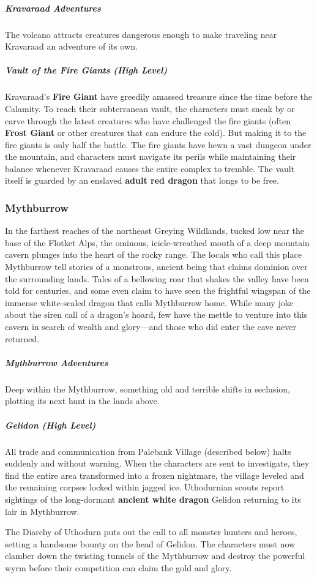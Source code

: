 \documentclass[10pt,a4paper,twoside,bg=print,twocolumn,openany,nodeprecatedcode]{dndbook}
\begin{document}
\subparagraph{Kravaraad Adventures}
The volcano attracts creatures dangerous enough to make traveling near Kravaraad an adventure of its own.

\subparagraph{Vault of the Fire Giants (High Level)}
Kravaraad's \textbf{Fire Giant} have greedily amassed treasure since the time before the Calamity. To reach their subterranean vault, the characters must sneak by or carve through the latest creatures who have challenged the fire giants (often \textbf{Frost Giant} or other creatures that can endure the cold). But making it to the fire giants is only half the battle. The fire giants have hewn a vast dungeon under the mountain, and characters must navigate its perils while maintaining their balance whenever Kravaraad causes the entire complex to tremble. The vault itself is guarded by an enslaved \textbf{adult red dragon} that longs to be free.

\subsubsection{Mythburrow}
In the farthest reaches of the northeast Greying Wildlands, tucked low near the base of the Flotket Alps, the ominous, icicle-wreathed mouth of a deep mountain cavern plunges into the heart of the rocky range. The locals who call this place Mythburrow tell stories of a monstrous, ancient being that claims dominion over the surrounding lands. Tales of a bellowing roar that shakes the valley have been told for centuries, and some even claim to have seen the frightful wingspan of the immense white-scaled dragon that calls Mythburrow home. While many joke about the siren call of a dragon's hoard, few have the mettle to venture into this cavern in search of wealth and glory—and those who did enter the cave never returned.

\subparagraph{Mythburrow Adventures}
Deep within the Mythburrow, something old and terrible shifts in seclusion, plotting its next hunt in the lands above.

\subparagraph{Gelidon (High Level)}
All trade and communication from Palebank Village (described below) halts suddenly and without warning. When the characters are sent to investigate, they find the entire area transformed into a frozen nightmare, the village leveled and the remaining corpses locked within jagged ice. Uthodurnian scouts report sightings of the long-dormant \textbf{ancient white dragon} Gelidon returning to its lair in Mythburrow.

The Diarchy of Uthodurn puts out the call to all monster hunters and heroes, setting a handsome bounty on the head of Gelidon. The characters must now clamber down the twisting tunnels of the Mythburrow and destroy the powerful wyrm before their competition can claim the gold and glory.
\end{document}
